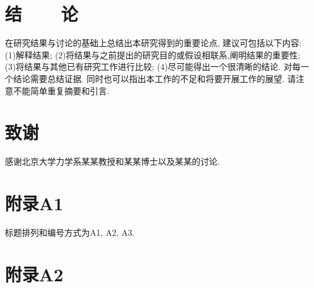\documentclass[A4,twoside,fontset=ubuntu,UTF8]{ctexart}
\begin{document}
\section{结~~~~论}

在研究结果与讨论的基础上总结出本研究得到的重要论点, 建议可包括以下内容:
(1)解释结果; (2)将结果与之前提出的研究目的或假设相联系,阐明结果的重要性;
(3)将结果与其他已有研究工作进行比较;
(4)尽可能得出一个很清晰的结论. 对每一个结论需要总结证据.
同时也可以指出本工作的不足和将要开展工作的展望.
请注意不能简单重复摘要和引言.

\section*{致谢}

感谢北京大学力学系某某教授和某某博士以及某某的讨论.


\section*{附录A1}

标题排列和编号方式为A1, A2, A3.

\section*{附录A2}
%
%
%
%
%
\end{document}
